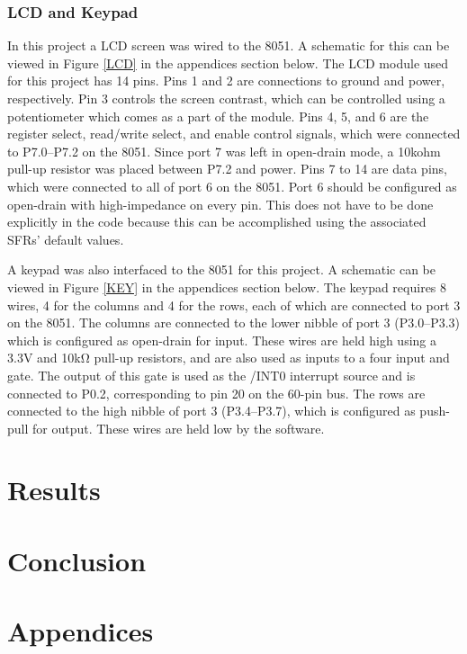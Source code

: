 \documentclass[12pt]{article}
\begin{document}
\subsubsection{LCD and Keypad}
In this project a LCD screen was wired to the 8051. A schematic for this can be viewed in Figure \ref{LCD} in the appendices section below. The LCD module used for this project has 14 pins.
Pins 1 and 2 are connections to ground and power, respectively. Pin 3 controls the screen contrast, which can be controlled using a potentiometer which comes as a part of the module. Pins 4, 5, and 6 are the register select, read/write select, and enable control signals, which were connected to P7.0--P7.2 on the 8051. Since port 7 was left in open-drain mode, a 10k\si{ohm} pull-up resistor was placed between P7.2 and power. Pins 7 to 14 are data pins, which were connected to all of port 6 on the 8051. Port 6 should be configured as open-drain with high-impedance on every pin. This does not have to be done explicitly in the code because this can be accomplished using the associated SFRs' default values.

A keypad was also interfaced to the 8051 for this project. A schematic can be viewed in Figure \ref{KEY} in the appendices section below. The keypad requires 8 wires, 4 for the columns and 4 for the rows, each of which are connected to port 3 on the 8051. The columns are connected to the lower nibble of port 3 (P3.0--P3.3) which is configured as open-drain for input. These wires are held high using a 3.3\si{V} and 10k\si{\ohm} pull-up resistors, and are also used as inputs to a four input and gate. The output of this gate is used as the /INT0 interrupt source and is connected to P0.2, corresponding to pin 20 on the 60-pin bus. The rows are connected to the high nibble of port 3 (P3.4--P3.7), which is configured as push-pull for output. These wires are held low by the software. 

\section{Results}

\section{Conclusion}
 


\section{Appendices}
\end{document}
